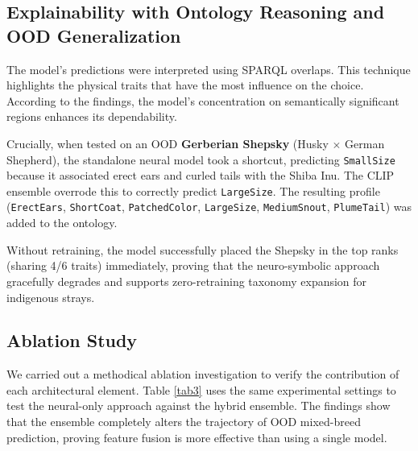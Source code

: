 \documentclass[conference]{IEEEtran}
\begin{document}
\subsection{Explainability with Ontology Reasoning and OOD Generalization}
The model's predictions were interpreted using SPARQL overlaps. This technique highlights the physical traits that have the most influence on the choice. According to the findings, the model's concentration on semantically significant regions enhances its dependability.

Crucially, when tested on an OOD \textbf{Gerberian Shepsky} (Husky $\times$ German Shepherd), the standalone neural model took a shortcut, predicting \texttt{SmallSize} because it associated erect ears and curled tails with the Shiba Inu. The CLIP ensemble overrode this to correctly predict \texttt{LargeSize}. The resulting profile (\texttt{ErectEars}, \texttt{ShortCoat}, \texttt{PatchedColor}, \texttt{LargeSize}, \texttt{MediumSnout}, \texttt{PlumeTail}) was added to the ontology.

Without retraining, the model successfully placed the Shepsky in the top ranks (sharing 4/6 traits) immediately, proving that the neuro-symbolic approach gracefully degrades and supports zero-retraining taxonomy expansion for indigenous strays.

\subsection{Ablation Study}
We carried out a methodical ablation investigation to verify the contribution of each architectural element. Table \ref{tab3} uses the same experimental settings to test the neural-only approach against the hybrid ensemble. The findings show that the ensemble completely alters the trajectory of OOD mixed-breed prediction, proving feature fusion is more effective than using a single model.

\begin{table}[htbp]
\caption{Ablation Study: Overcoming Neural Shortcut Bias (Shepsky Case Study)}
\begin{center}
\label{tab3}
\end{center}
\end{table}
\end{document}
